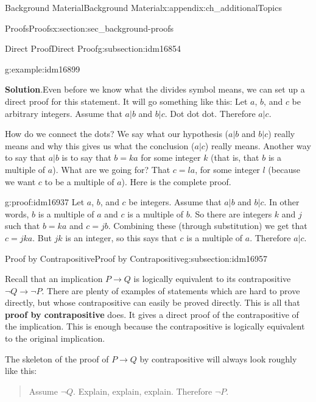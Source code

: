 \documentclass[oneside,10pt,]{book}
\newcommand{\terminology}[1]{\textbf{#1}}
\numberwithin{equation}{chapter}
\def\imp{\rightarrow}
\begin{document}
\begin{appendixptx}{Background Material}{}{Background Material}{}{}{x:appendix:ch_additionalTopics}
\begin{sectionptx}{Proofs}{}{Proofs}{}{}{x:section:sec_background-proofs}
\begin{subsectionptx}{Direct Proof}{}{Direct Proof}{}{}{g:subsection:idm16854}
\begin{example}{}{g:example:idm16899}
\par\smallskip%
\noindent\textbf{Solution}.\hypertarget{g:solution:idm16916}{}\quad{}Even before we know what the divides symbol means, we can set up a direct proof for this statement. It will go something like this: Let \(a\), \(b\), and \(c\) be arbitrary integers. Assume that \(a|b\) and \(b|c\). Dot dot dot. Therefore \(a|c\).%
\par
How do we connect the dots? We say what our hypothesis (\(a|b\) and \(b|c\)) really means and why this gives us what the conclusion (\(a|c\)) really means. Another way to say that \(a|b\) is to say that \(b = ka\) for some integer \(k\) (that is, that \(b\) is a multiple of \(a\)). What are we going for? That \(c = la\), for some integer \(l\) (because we want \(c\) to be a multiple of \(a\)). Here is the complete proof.%
\begin{proofptx}{}{g:proof:idm16937}
Let \(a\), \(b\), and \(c\) be integers. Assume that \(a|b\) and \(b|c\). In other words, \(b\) is a multiple of \(a\) and \(c\) is a multiple of \(b\). So there are integers \(k\) and \(j\) such that \(b = ka\) and \(c = jb\). Combining these (through substitution) we get that \(c = jka\). But \(jk\) is an integer, so this says that \(c\) is a multiple of \(a\). Therefore \(a|c\).%
\end{proofptx}
\end{example}
\end{subsectionptx}
%
%
\typeout{************************************************}
\typeout{************************************************}
%
\begin{subsectionptx}{Proof by Contrapositive}{}{Proof by Contrapositive}{}{}{g:subsection:idm16957}
%
\par
Recall that an implication \(P \imp Q\) is logically equivalent to its contrapositive \(\neg Q \imp \neg P\). There are plenty of examples of statements which are hard to prove directly, but whose contrapositive can easily be proved directly. This is all that \terminology{proof by contrapositive} does. It gives a direct proof of the contrapositive of the implication. This is enough because the contrapositive is logically equivalent to the original implication.%
\par
The skeleton of the proof of \(P \imp Q\) by contrapositive will always look roughly like this:%
\begin{quote}%
Assume \(\neg Q\). Explain, explain, \textellipsis{} explain. Therefore \(\neg P\).%

\end{quote}
\end{subsectionptx}
\end{sectionptx}
\end{appendixptx}
\end{document}
